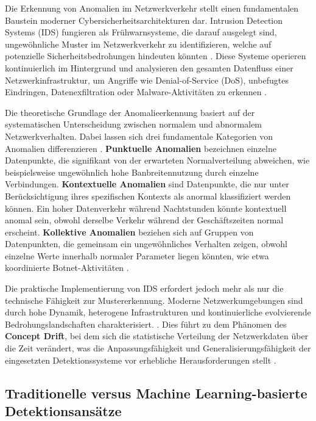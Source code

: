 \documentclass[11pt,a4paper]{article}
\begin{document}
    Die Erkennung von Anomalien im Netzwerkverkehr stellt einen fundamentalen Baustein moderner Cybersicherheitsarchitekturen dar. Intrusion Detection Systems (IDS) fungieren als Frühwarnsysteme, die darauf ausgelegt sind, ungewöhnliche Muster im Netzwerkverkehr zu identifizieren, welche  auf potenzielle Sicherheitsbedrohungen hindeuten könnten \parencite{Ring2019}. Diese Systeme operieren kontinuierlich im Hintergrund und analysieren den gesamten Datenfluss einer Netzwerkinfrastruktur, um Angriffe wie Denial-of-Service (DoS), unbefugtes Eindringen, Datenexfiltration oder Malware-Aktivitäten zu erkennen \parencite{Vinayakumar2019}.

    Die theoretische Grundlage der Anomalieerkennung basiert auf der systematischen Unterscheidung zwischen normalem und abnormalem Netzwerkverhalten. Dabei lassen sich drei fundamentale Kategorien von Anomalien differenzieren \parencite{Ring2019}. \textbf{Punktuelle Anomalien} bezeichnen einzelne Datenpunkte, die signifikant von der erwarteten Normalverteilung abweichen, wie beispielsweise ungewöhnlich hohe Banbreitennutzung durch einzelne Verbindungen. \textbf{Kontextuelle Anomalien} sind Datenpunkte, die nur unter Berücksichtigung ihres spezifischen Kontexts als anormal klassifiziert werden können. Ein hoher Datenverkehr während Nachtstunden könnte kontextuell anomal sein, obwohl derselbe Verkehr während der Geschäftszeiten normal erscheint. \textbf{Kollektive Anomalien} beziehen sich auf Gruppen von Datenpunkten, die gemeinsam ein ungewöhnliches Verhalten zeigen, obwohl einzelne Werte innerhalb normaler Parameter liegen könnten, wie etwa koordinierte Botnet-Aktivitäten \parencite{Ring2019}.

    Die praktische Implementierung von IDS erfordert jedoch mehr als nur die technische Fähigkeit zur Mustererkennung. Moderne Netzwerkumgebungen sind durch hohe Dynamik, heterogene Infrastrukturen und kontinuierliche evolvierende Bedrohungslandschaften charakterisiert. \parencite{Gharib2016}. Dies führt zu dem Phänomen des \textbf{Concept Drift}, bei dem sich die statistische Verteilung der Netzwerkdaten über die Zeit verändert, was die Anpassungsfähigkeit und Generalisierungsfähigkeit der eingesetzten Detektionssysteme vor erhebliche Herausforderungen stellt \parencite{Ring2019}.


    \subsection{Traditionelle versus Machine Learning-basierte Detektionsansätze}
\end{document}
